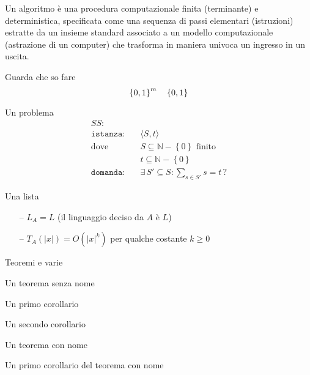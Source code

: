 \begin{definition}[Algoritmo]\label{def:algex}
    Un algoritmo è una procedura computazionale finita (terminante) e deterministica, specificata come una sequenza di passi elementari (istruzioni) estratte da un insieme standard associato a un modello computazionale (astrazione di un computer) che trasforma in maniera univoca un ingresso in un uscita.
\end{definition}

Guarda che so fare
\begin{equation*}
    \left\{0,1\right\}^{m}
    \quad
    \left\{0,1\right\}^{}
\end{equation*}

Un problema
\begin{align*}
    SS: & \\
    \texttt{istanza:} \quad & \langle S,t \rangle \\
    \text{dove} \quad & S \subseteq \mathbb{N} - \left\{ 0 \right\} \text{ finito} \\
    & t \subseteq \mathbb{N} - \left\{ 0 \right\} \\
    \texttt{domanda:} \quad & \exists \, S' \subseteq S : \sum_{s \in S'}^{} s = t \, ?
\end{align*}

Una lista
\begin{itemize}[noitemsep,parsep=0pt,partopsep=0pt,topsep=0pt]
    \item[--] $L_A = L$ (il linguaggio deciso da $A$ è $L$)
    \item[--] $T_A(|x|) = O(|x|^k)$ per qualche costante $k \geq 0$
\end{itemize}

Teoremi e varie

\begin{theorem}
    Un teorema senza nome
\end{theorem}

\begin{corollario}
    Un primo corollario
\end{corollario}

\begin{corollario}
    Un secondo corollario
\end{corollario}

\begin{theorem}
    Un teorema con nome
\end{theorem}

\begin{corollario}
    Un primo corollario del teorema con nome
\end{corollario}

